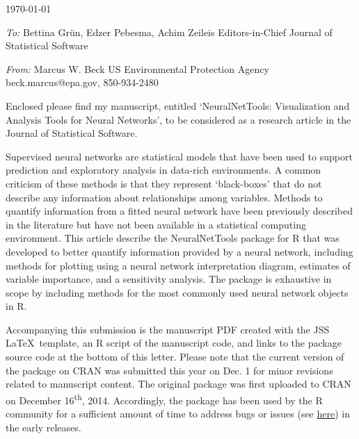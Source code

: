 \documentclass[a4paper,12pt]{article}
\begin{document}
\renewcommand{\rmdefault}{ptm}
\pagestyle{empty} 

\setlength{\parindent}{0mm} 
\setlength{\parskip}{5mm}

\begin{flushright}
\today
\end{flushright}

\emph{To:}\newline
Bettina Gr\"un, Edzer Pebesma, Achim Zeileis\newline
Editors-in-Chief\newline
Journal of Statistical Software

\emph{From:}\newline
Marcus W. Beck\newline
US Environmental Protection Agency\newline
beck.marcus@epa.gov, 850-934-2480\vspace{0.1in}

Enclosed please find my manuscript, entitled `NeuralNetTools: Visualization and Analysis Tools for Neural Networks', to be considered as a research article in the Journal of Statistical Software. 

Supervised neural networks are statistical models that have been used to support prediction and exploratory analysis in data-rich environments.  A common criticism of these methods is that they represent `black-boxes' that do not describe any information about relationships among variables.  Methods to quantify information from a fitted neural network have been previously described in the literature but have not been available in a statistical computing environment.  This article describe the NeuralNetTools package for R that was developed to better quantify information provided by a neural network, including methods for plotting using a neural network interpretation diagram, estimates of variable importance, and a sensitivity analysis.  The package is exhaustive in scope by including methods for the most commonly used neural network objects in R.   

Accompanying this submission is the manuscript PDF created with the JSS \LaTeX\ template, an R script of the manuscript code, and links to the package source code at the bottom of this letter.  Please note that the current version of the package on CRAN was submitted this year on Dec. 1 for minor revisions related to manuscript content.  The original package was first uploaded to CRAN on December 16\textsuperscript{th}, 2014.  Accordingly, the package has been used by the R community for a sufficient amount of time to address bugs or issues (see \href{https://github.com/fawda123/NeuralNetTools/issues?q=is%3Aissue+is%3Aclosed}{here}) in the early releases.    
\end{document}
